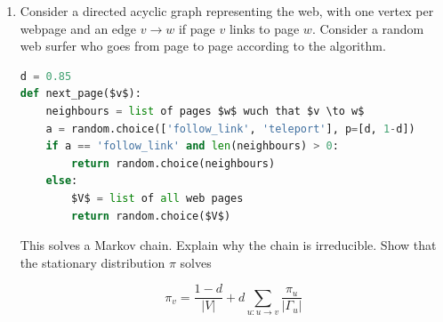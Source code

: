 \documentclass[10pt,\jkfside,a4paper]{article}
\begin{document}
\begin{enumerate}
\begin{enumerate}[label=(\alph*)]

\item Give pseudocode to compute the transition matrix. You should give your
answer in terms of \texttt{binom.pmf} and \texttt{poisson.pmf}, the
likelihood functions for the two distributions in question.

\begin{lstlisting}[language=Python, mathescape=true]
P = np.zeros((N, N))
for i in range(1, N-1):
	for j in range(N):
		prob = stats.poisson.pmf(j - i + np.arange(i+1), r * i / d) * \
		stats.binom.pmf(np.arange(i+1), i, 1 / d)
		P[i, j] = np.sum(prob)
P[0, 0] = 1
P[-1, -1] = 1
P /= np.sum(P, axis=1, keepdims=True)
\end{lstlisting}

\item Give pseudocode to compute the probability that the epidemic dies out, 
starting from any initial state $x \in \{0, \dots, N\}$.

\begin{lstlisting}[language=Python, mathescape=true]
condition1 = np.zeros(N)
condition1[0] = 1
condition2 = np.zeros(N)
condition2[-1] = 1
matrix = np.concatenate((P - np.eye(N), [condition1, condition2]))
print(matrix)
target = np.zeros(N + 2)
target[-2] = 1
np.linalg.lstsq(matrix, target, rcond=None)
\end{lstlisting}

\end{enumerate}

\item Consider a directed acyclic graph representing the web, with one
vertex per webpage and an edge $v \to w$ if page $v$ links to page $w$.
Consider a random web surfer who goes from page to page according to the
algorithm.

\begin{lstlisting}[language=Python, mathescape=true]
d = 0.85
def next_page($v$):
	neighbours = list of pages $w$ wuch that $v \to w$
	a = random.choice(['follow_link', 'teleport'], p=[d, 1-d])
	if a == 'follow_link' and len(neighbours) > 0:
		return random.choice(neighbours)
	else:
		$V$ = list of all web pages
		return random.choice($V$)
\end{lstlisting}

This solves a Markov chain. Explain why the chain is irreducible. Show that
the stationary distribution $\pi$ solves

\[
\pi_v = \frac{1 - d}{|V|} + d \sum^{}_{u:u \to v} \frac{\pi_u}{| \Gamma_u |}
\]


\end{enumerate}
\end{document}
